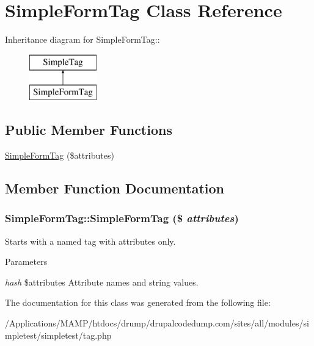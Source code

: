 \hypertarget{class_simple_form_tag}{
\section{SimpleFormTag Class Reference}
\label{class_simple_form_tag}
}
Inheritance diagram for SimpleFormTag::\begin{figure}[H]
\begin{center}
\leavevmode
\includegraphics[height=2cm]{class_simple_form_tag}
\end{center}
\end{figure}
\subsection*{Public Member Functions}
\begin{DoxyCompactItemize}
\item 
\hyperlink{class_simple_form_tag_af3b952a844e7819034641f55ea480d6d}{SimpleFormTag} (\$attributes)
\end{DoxyCompactItemize}


\subsection{Member Function Documentation}
\hypertarget{class_simple_form_tag_af3b952a844e7819034641f55ea480d6d}{
\subsubsection[{SimpleFormTag}]{\setlength{\rightskip}{0pt plus 5cm}SimpleFormTag::SimpleFormTag (\$ {\em attributes})}}
\label{class_simple_form_tag_af3b952a844e7819034641f55ea480d6d}
Starts with a named tag with attributes only. 
\begin{DoxyParams}{Parameters}
\item[{\em hash}]\$attributes Attribute names and string values. \end{DoxyParams}


The documentation for this class was generated from the following file:\begin{DoxyCompactItemize}
\item 
/Applications/MAMP/htdocs/drump/drupalcodedump.com/sites/all/modules/simpletest/simpletest/tag.php\end{DoxyCompactItemize}
